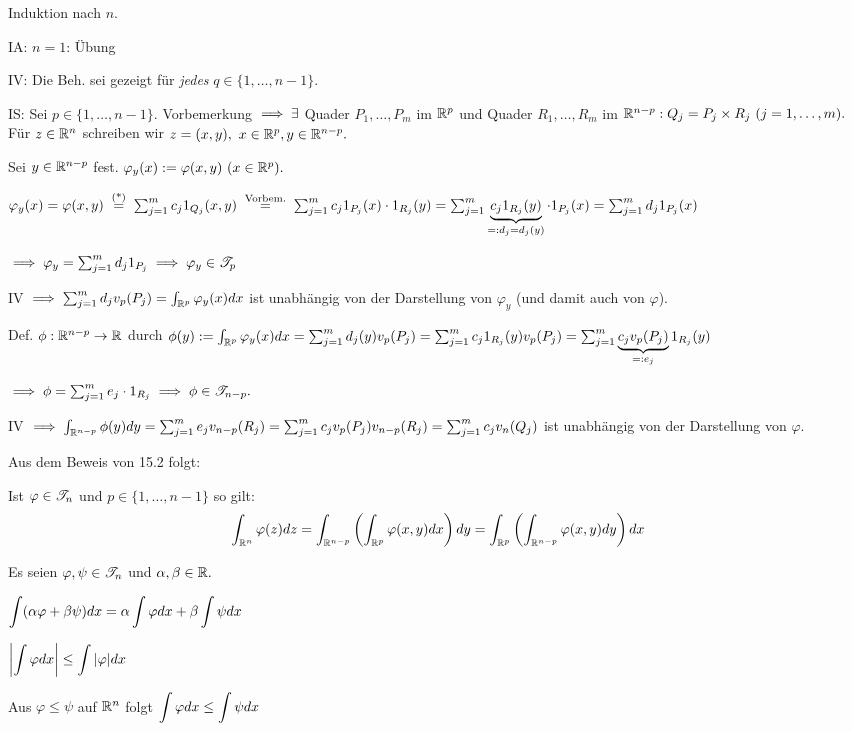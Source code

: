 \documentclass[a4paper,twoside,DIV15,BCOR12mm]{scrbook}
\begin{document}
\begin{beweis}[von 15.2]
Induktion nach $n$.

IA: $n=1$: Übung

IV: Die Beh. sei gezeigt für \emph{jedes} $q\in\{1,\ldots,n-1\}$.

IS: Sei $p\in\{1,\ldots,n-1\}.$ Vorbemerkung $\implies \exists$ Quader $P_1,\ldots,P_m$ im $\mathbb{R}^p$ und Quader $R_1,\ldots,R_m$ im $\MdR^{n-p}: Q_j=P_j\times R_j\ (j=1,\ldots,m).$ Für $z\in\mathbb{R}^n$ schreiben wir $z=(x,y),\ x\in\mathbb{R}^p, y\in\mathbb{R}^{n-p}.$

Sei $y\in\mathbb{R}^{n-p}$ fest. $\varphi_y(x):=\varphi(x,y)\ (x\in\MdR^p).$

$\varphi_y(x)=\varphi(x,y) \gleichnach{(*)} \sum_{j=1}^m c_j1_{Q_j}(x,y) \gleichnach{Vorbem.}\sum_{j=1}^m c_j1_{P_j}(x)\cdot1_{R_j}(y) = \sum_{j=1}^m \underbrace{c_j1_{R_j}(y)}_{=:d_j=d_j(y)}\cdot1_{P_j}(x) = \sum_{j=1}^m d_j1_{P_j}(x)$

$\implies \varphi_y = \sum_{j=1}^m d_j1_{P_j} \implies \varphi_y \in \mathscr{T}_p$

IV $\implies \sum_{j=1}^m d_jv_p(P_j) = \int_{\mathbb{R}^p}\varphi_y(x)dx$ ist unabhängig von der Darstellung von $\varphi_y$ (und damit auch von $\varphi$).

Def. $\phi:\mathbb{R}^{n-p}\to\mathbb{R}$ durch $\phi(y):=\int_{\mathbb{R}^p}\varphi_y(x)dx = \sum_{j=1}^m d_j(y)v_p(P_j) = \sum_{j=1}^m c_j1_{R_j}(y)v_p(P_j) = \sum_{j=1}^m \underbrace{c_jv_p(P_j)}_{=:e_j}1_{R_j}(y)$

$\implies \phi = \sum_{j=1}^m e_j\cdot1_{R_j} \implies \phi \in \mathscr{T}_{n-p}.$

IV $\implies \int_{\mathbb{R}^{n-p}}\phi(y)dy = \sum_{j=1}^m e_jv_{n-p}(R_j) = \sum_{j=1}^m c_jv_p(P_j)v_{n-p}(R_j) = \sum_{j=1}^m c_jv_n(Q_j)$ ist unabhängig von der Darstellung von $\varphi$.
\end{beweis}

Aus dem Beweis von 15.2 folgt:

\begin{satz}
Ist $\varphi\in\mathscr{T}_n$ und $p\in\{1,\ldots,n-1\}$ so gilt: $$\int_{\mathbb{R}^n}\varphi(z)dz = \int_{\mathbb{R}^{n-p}}\left(\int_{\mathbb{R}^p}\varphi(x,y)dx\right)dy = \int_{\mathbb{R}^p}\left(\int_{\mathbb{R}^{n-p}}\varphi(x,y)dy\right)dx$$
\end{satz}

\begin{satz}
Es seien $\varphi,\psi\in\mathscr{T}_n$ und $\alpha,\beta\in\mathbb{R}.$
\begin{liste}
\item $\displaystyle{\int(\alpha\varphi+\beta\psi)dx = \alpha\int\varphi dx+\beta\int\psi dx}$
\item $\displaystyle{\left|\int\varphi dx\right| \le \int|\varphi|dx}$
\item Aus $\varphi\le\psi$ auf $\mathbb{R}^n$ folgt $\displaystyle{\int\varphi dx \le \int\psi dx}$
\end{liste}
\end{satz}
\end{document}
